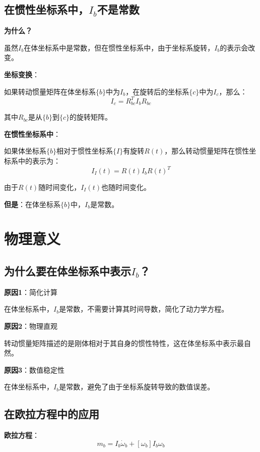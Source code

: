 \documentclass[12pt,a4paper]{article}
\begin{document}
\subsection{在惯性坐标系中，$I_b$不是常数}

\textbf{为什么？}

虽然$I_b$在体坐标系中是常数，但在惯性坐标系中，由于坐标系旋转，$I_b$的表示会改变。

\textbf{坐标变换}：

如果转动惯量矩阵在体坐标系$\{b\}$中为$I_b$，在旋转后的坐标系$\{c\}$中为$I_c$，那么：
\begin{equation}
I_c = R_{bc}^T I_b R_{bc}
\end{equation}

其中$R_{bc}$是从$\{b\}$到$\{c\}$的旋转矩阵。

\textbf{在惯性坐标系中}：

如果体坐标系$\{b\}$相对于惯性坐标系$\{I\}$有旋转$R(t)$，那么转动惯量矩阵在惯性坐标系中的表示为：
\begin{equation}
I_I(t) = R(t) I_b R(t)^T
\end{equation}

由于$R(t)$随时间变化，$I_I(t)$也随时间变化。

\textbf{但是}：在体坐标系$\{b\}$中，$I_b$是常数。

\section{物理意义}

\subsection{为什么要在体坐标系中表示$I_b$？}

\textbf{原因1}：简化计算

在体坐标系中，$I_b$是常数，不需要计算其时间导数，简化了动力学方程。

\textbf{原因2}：物理直观

转动惯量矩阵描述的是刚体相对于其自身的惯性特性，这在体坐标系中表示最自然。

\textbf{原因3}：数值稳定性

在体坐标系中，$I_b$是常数，避免了由于坐标系旋转导致的数值误差。

\subsection{在欧拉方程中的应用}

\textbf{欧拉方程}：
\begin{equation}
m_b = I_b \dot{\omega}_b + [\omega_b] I_b \omega_b
\end{equation}
\end{document}
